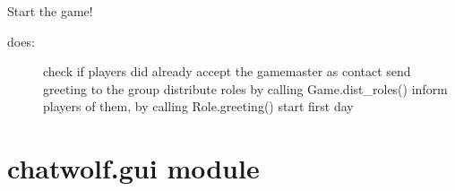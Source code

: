 \documentclass[letterpaper,10pt,english]{sphinxmanual}
\begin{document}
\begin{fulllineitems}
\begin{fulllineitems}
\label{\detokenize{chatwolf:chatwolf.game.Game.save_config}}
\end{fulllineitems}


\begin{fulllineitems}
\label{\detokenize{chatwolf:chatwolf.game.Game.start}}
Start the game!
\begin{description}
\item[{does:}] \leavevmode
check if players did already accept the game\sphinxhyphen{}master as contact
send greeting to the group
distribute roles by calling Game.dist\_roles()
inform players of them, by calling Role.greeting()
start first day

\end{description}

\end{fulllineitems}


\end{fulllineitems}



\section{chatwolf.gui module}
\label{\detokenize{chatwolf:module-chatwolf.gui}}\label{\detokenize{chatwolf:chatwolf-gui-module}}
\end{document}
